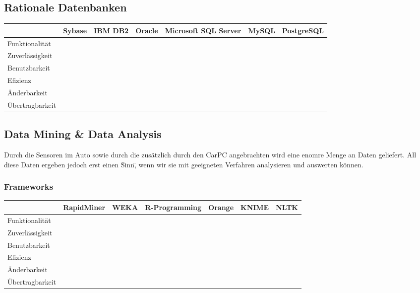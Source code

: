 	\subsection{Rationale Datenbanken}
		
		\begin{tabular} {| l | c | c | c | c | c | c |}
			\hline
			& Sybase & IBM DB2 & Oracle & Microsoft SQL Server & MySQL & PostgreSQL	\\ \hline \hline
			Funktionalität &  &	 &  &  &  &  &		\\ \hline
			Zuverlässigkeit &  &	 &  &  &  &  &	 			\\ \hline
			Benutzbarkeit &  &	 &  &  &  &  &	 		\\ \hline
			Efizienz &  &	 &  &  &  &  &			\\ \hline
			Änderbarkeit &  &  &  &  &  &  &		\\ \hline 
			Übertragbarkeit	&  &	&  &  &  &  &					\\ \hline
		\end{tabular}

	\newpage
	\subsection{Data Mining \& Data Analysis}
	Durch die Sensoren im Auto sowie durch die zusätzlich durch den CarPC angebrachten wird eine enomre Menge an Daten geliefert. All diese Daten ergeben jedoch erst einen \"Sinn\", wenn wir sie mit geeigneten Verfahren analysieren und auswerten können. 

		\subsubsection{Frameworks}

		\begin{tabular} {| l | c | c | c | c | c | c |}
			\hline
			& RapidMiner & WEKA &  R-Programming & Orange & KNIME & NLTK		\\ \hline \hline
			Funktionalität &  &	 &  &  &  &  &		\\ \hline
			Zuverlässigkeit &  &	 &  &  &  &  &	 			\\ \hline
			Benutzbarkeit &  &	 &  &  &  &  &	 		\\ \hline
			Efizienz &  &	 &  &  &  &  &			\\ \hline
			Änderbarkeit &  &  &  &  &  &  &		\\ \hline 
			Übertragbarkeit	&  &	&  &  &  &  &					\\ \hline
		\end{tabular}

